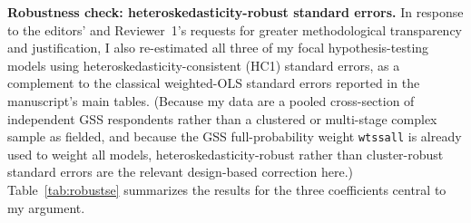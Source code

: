\documentclass[11pt]{article}
\begin{document}
\medskip
\noindent\textbf{Robustness check: heteroskedasticity-robust standard errors.} In response to the editors' and Reviewer~1's requests for greater methodological transparency and justification, I also re-estimated all three of my focal hypothesis-testing models using heteroskedasticity-consistent (HC1) standard errors, as a complement to the classical weighted-OLS standard errors reported in the manuscript's main tables. (Because my data are a pooled cross-section of independent GSS respondents rather than a clustered or multi-stage complex sample as fielded, and because the GSS full-probability weight \texttt{wtssall} is already used to weight all models, heteroskedasticity-robust rather than cluster-robust standard errors are the relevant design-based correction here.) Table~\ref{tab:robustse} summarizes the results for the three coefficients central to my argument.

\begin{table}[htbp]
\centering
\caption{Classical Weighted-OLS vs.\ Heteroskedasticity-Robust (HC1) Standard Errors for Focal Coefficients}
\label{tab:robustse}
\end{table}
\end{document}
